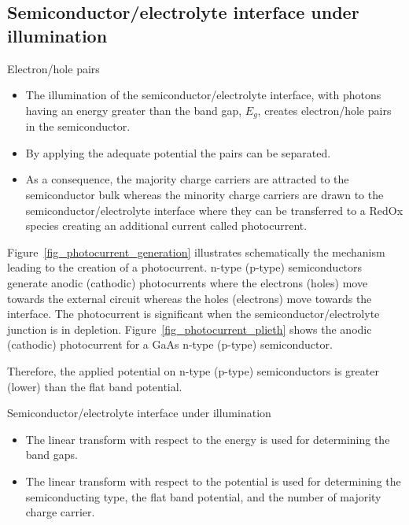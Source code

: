 \documentclass[10pt,compress]{beamer}
\begin{document}
\subsection{Semiconductor/electrolyte interface under illumination}
    \begin{frame}[allowframebreaks=1.0]{Electron/hole pairs}
    \begin{itemize} 
        \item The illumination of the semiconductor/electrolyte interface, 
        with photons having an energy greater than the band gap, $E_g$, creates 
        electron/hole pairs in the semiconductor. 
        \item By applying the adequate potential the pairs can be separated. 
        \item As a consequence, the majority charge carriers are attracted to the 
        semiconductor bulk whereas the minority charge carriers are drawn to the 
        semiconductor/electrolyte interface where they can be transferred to a RedOx 
        species creating an additional current called photocurrent.  
    \end{itemize}
    
    Figure~\ref{fig_photocurrent_generation} illustrates schematically the 
    mechanism leading to the creation of a photocurrent. n-type (p-type) 
    semiconductors generate anodic (cathodic) photocurrents where the 
    electrons (holes) move towards the external circuit whereas the holes (electrons) 
    move towards the interface. 
    The photocurrent is significant when the semiconductor/electrolyte junction 
    is in depletion. 
    Figure~\ref{fig_photocurrent_plieth} shows the anodic (cathodic) photocurrent 
    for a GaAs n-type (p-type) semiconductor.

    Therefore, the applied potential on n-type (p-type) semiconductors is 
    greater (lower) than the flat band potential. 



    \end{frame}


    \begin{frame}[allowframebreaks=1.0]{Semiconductor/electrolyte interface under illumination}
        \begin{itemize}
            \item The linear transform with respect to the energy is used for determining the band gaps. 
            \item The linear transform with respect to the potential  is used for determining 
                  the semiconducting type, the flat band potential, 
                  and the number of majority charge carrier.
        \end{itemize}
    \end{frame}
\end{document}
